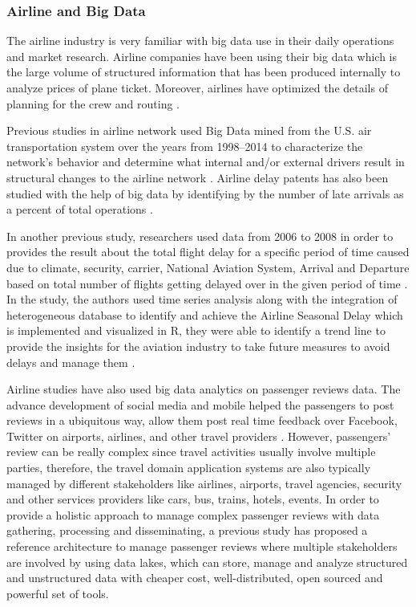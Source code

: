\subsubsection{Airline and Big Data}
The airline industry is very familiar with big data use in their daily operations
and market research. Airline companies have been using their big data which is 
the large volume of structured information that has been produced internally 
\cite{MIAH2017} to analyze prices of plane ticket. Moreover, airlines 
have optimized the details of planning for the crew and routing \cite{Shafiee16}. 

Previous studies in airline network used Big Data mined from the U.S. air 
transportation system over the years from 1998–2014 to characterize the 
network's behavior and determine what internal and/or external drivers result 
in structural changes to the airline network \cite{7777957}. Airline delay 
patents has also been studied with the help of big data by identifying by the 
number of late arrivals as a percent of total operations \cite{Sor}. 

In another previous study, researchers used data from 2006 to 2008 in order 
to provides the result about the total flight delay for a specific period of 
time caused due to climate, security, carrier, National Aviation System, Arrival
and Departure based on total number of flights getting delayed over in the 
given period of time \cite{Sor}. In the study, the authors used time series 
analysis along with the integration of heterogeneous database to identify and 
achieve the Airline Seasonal Delay which is implemented and visualized in R, 
they were able to identify a trend line to provide the insights for the aviation
industry to take future measures to avoid delays and manage them \cite{Sor}.

Airline studies have also used big data analytics on passenger reviews data.
The advance development of social media and mobile helped the passengers to 
post reviews in a ubiquitous way, allow them post real time feedback over 
Facebook, Twitter on airports, airlines, and other travel providers
\cite{CHEN2016285}. However, passengers' review can be really complex 
since travel activities usually involve multiple parties, therefore, the
travel domain application systems are also typically managed by different 
stakeholders like airlines, airports, travel agencies, security and other 
services providers like cars, bus, trains, hotels, events. In order to 
provide a holistic approach to manage complex passenger reviews with data 
gathering, processing and disseminating, a previous study has proposed a 
reference architecture to manage passenger reviews where multiple 
stakeholders are involved by using data lakes, which can store, manage 
and analyze structured and unstructured data with cheaper cost, 
well-distributed, open sourced and powerful set of tools.

